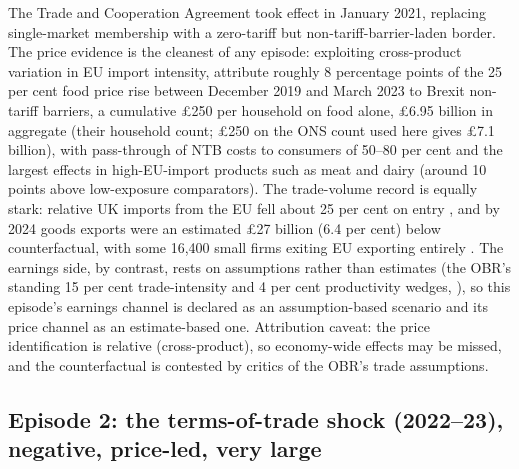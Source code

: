 The Trade and Cooperation Agreement took effect in January 2021,
replacing single-market membership with a zero-tariff but
non-tariff-barrier-laden border. The price evidence is the cleanest of
any episode: exploiting cross-product variation in EU import intensity,
\citet{bakker2026} attribute roughly 8 percentage points of the 25 per
cent food price rise between December 2019 and March 2023 to Brexit
non-tariff barriers, a cumulative \pounds 250 per household on food
alone, \pounds 6.95 billion in aggregate (their household count;
\pounds 250 on the ONS count used here gives \pounds 7.1 billion), with pass-through of NTB costs
to consumers of 50--80 per cent and the largest effects in
high-EU-import products such as meat and dairy (around 10 points above
low-exposure comparators). The trade-volume record is equally stark:
relative UK imports from the EU fell about 25 per cent on entry
\citep{freeman2022}, and by 2024 goods exports were an estimated
\pounds 27 billion (6.4 per cent) below counterfactual, with some
16,400 small firms exiting EU exporting entirely
\citep{freeman2024}. The earnings side, by contrast, rests on
assumptions rather than estimates (the OBR's standing 15 per cent
trade-intensity and 4 per cent productivity wedges,
\citealp{obrbrexit}), so this episode's earnings channel is declared as an assumption-based
scenario and its price channel as an estimate-based one. Attribution
caveat: the price identification is relative (cross-product), so
economy-wide effects may be missed, and the counterfactual is contested
by critics of the OBR's trade assumptions.

\subsection{Episode 2: the terms-of-trade shock (2022--23), negative, price-led, very large}

